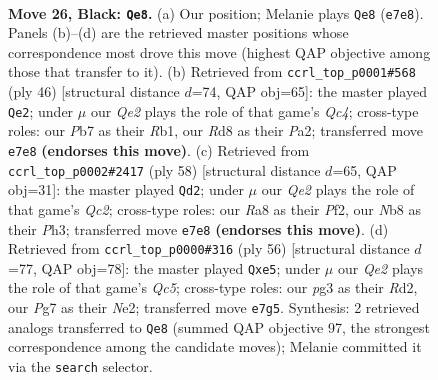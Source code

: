 \documentclass[11pt]{article}
\begin{document}
\clearpage

\begin{figure}[p]\centering
\begin{subfigure}{0.46\textwidth}\centering
\resizebox{\linewidth}{!}{%
\newchessgame
\chessboard[
  setfen={rn1r2k1/pp2qppp/8/2P1P1B1/6Q1/P5P1/1P3P2/1BR1R1K1 b - - 2 26},
  showmover=false,
  pgfstyle=straightmove, color=movearrow, markmove={e7-e8}
]}
\caption{}
\end{subfigure}\hfill
\begin{subfigure}{0.46\textwidth}\centering
\resizebox{\linewidth}{!}{%
\newchessgame
\chessboard[
  setfen={r1b2r2/p4qk1/2pp3p/4p1p1/2Q1P3/4R2P/P2B1PP1/1R4K1 w - - 2 24},
  showmover=false,
  pgfstyle=straightmove, color=movearrow, markmove={c4-e2}
]}
\caption{}
\end{subfigure}
\\[4pt]
\begin{subfigure}{0.46\textwidth}\centering
\resizebox{\linewidth}{!}{%
\newchessgame
\chessboard[
  setfen={r3r1k1/1pq2p2/p1pRbP1p/8/P7/7P/1PQ2PP1/R5K1 w - - 3 30},
  showmover=false,
  pgfstyle=straightmove, color=movearrow, markmove={c2-d2}
]}
\caption{}
\end{subfigure}\hfill
\begin{subfigure}{0.46\textwidth}\centering
\resizebox{\linewidth}{!}{%
\newchessgame
\chessboard[
  setfen={2b1r1k1/1p2rpp1/2p4p/2Q1q3/1P6/4P2P/3RNPP1/3R2K1 w - - 7 29},
  showmover=false,
  pgfstyle=straightmove, color=movearrow, markmove={c5-e5}
]}
\caption{}
\end{subfigure}
\caption{\textbf{Move 26, Black: \texttt{Qe8}.} (a) Our position; Melanie plays \texttt{Qe8} (\texttt{e7e8}). Panels (b)--(d) are the retrieved master positions whose correspondence most drove this move (highest QAP objective among those that transfer to it). (b) Retrieved from \texttt{ccrl\_top\_p0001\#568} (ply 46) [structural distance $d$=74, QAP obj=65]: the master played \texttt{Qe2}; under $\mu$ our \emph{Qe2} plays the role of that game's \emph{Qc4}; cross-type roles: our \emph{P}b7 as their \emph{R}b1, our \emph{R}d8 as their \emph{P}a2; transferred move \texttt{e7e8} \textbf{(endorses this move)}. (c) Retrieved from \texttt{ccrl\_top\_p0002\#2417} (ply 58) [structural distance $d$=65, QAP obj=31]: the master played \texttt{Qd2}; under $\mu$ our \emph{Qe2} plays the role of that game's \emph{Qc2}; cross-type roles: our \emph{R}a8 as their \emph{P}f2, our \emph{N}b8 as their \emph{P}h3; transferred move \texttt{e7e8} \textbf{(endorses this move)}. (d) Retrieved from \texttt{ccrl\_top\_p0000\#316} (ply 56) [structural distance $d$=77, QAP obj=78]: the master played \texttt{Qxe5}; under $\mu$ our \emph{Qe2} plays the role of that game's \emph{Qc5}; cross-type roles: our \emph{p}g3 as their \emph{R}d2, our \emph{P}g7 as their \emph{N}e2; transferred move \texttt{e7g5}. Synthesis: 2 retrieved analogs transferred to \texttt{Qe8} (summed QAP objective 97, the strongest correspondence among the candidate moves); Melanie committed it via the \texttt{search} selector.}
\label{fig:thought-m51}
\end{figure}
\end{document}
